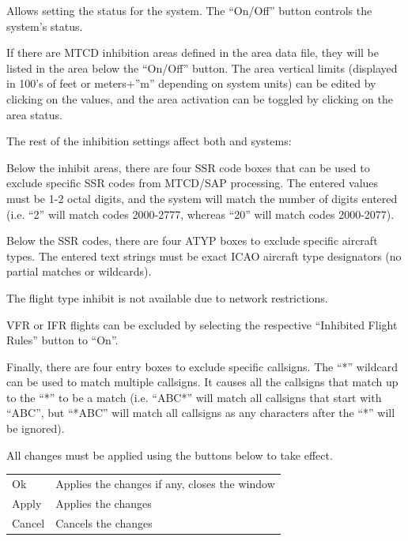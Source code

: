 \documentclass[a4paper,oneside,11pt]{memoir}
\begin{document}
\bigskip


Allows setting the status for the  system. The “On/Off” button controls the system’s status.

\bigskip

If there are MTCD inhibition areas defined in the area data file, they will be listed in the area below the “On/Off” button. The area vertical limits (displayed in 100’s of feet or meters+”m” depending on system units) can be edited by clicking on the values, and the area activation can be toggled by clicking on the area status.

\bigskip

The rest of the inhibition settings affect both  and  systems:

\bigskip

Below the inhibit areas, there are four SSR code boxes that can be used to exclude specific SSR codes from MTCD/SAP processing. The entered values must be 1-2 octal digits, and the system will match the number of digits entered (i.e. “2” will match codes 2000-2777, whereas “20” will match codes 2000-2077).

\bigskip

Below the SSR codes, there are four ATYP boxes to exclude specific aircraft types. The entered text strings must be exact ICAO aircraft type designators (no partial matches or wildcards).

\bigskip

The flight type inhibit is not available due to network restrictions.

\bigskip

VFR or IFR flights can be excluded by selecting the respective “Inhibited Flight Rules” button to “On”.

\bigskip

Finally, there are four entry boxes to exclude specific callsigns. The “*” wildcard can be used to match multiple callsigns. It causes all the callsigns that match up to the “*” to be a match (i.e. “ABC*” will match all callsigns that start with “ABC”, but “*ABC” will match all callsigns as any characters after the “*” will be ignored).

\bigskip

All changes must be applied using the buttons below to take effect.

\bigskip

\begin{longtable}{p{2.5cm} p{10cm}}
    Ok      & Applies the changes if any, closes the window\\
    Apply   & Applies the changes\\
    Cancel  & Cancels the changes\\
\end{longtable}
\end{document}
